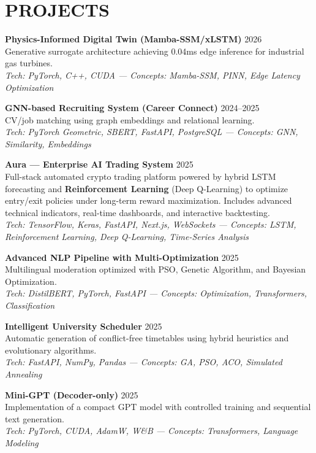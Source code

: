 \documentclass[a4paper,12pt]{article}
\begin{document}
\section{PROJECTS}
\setlength{\parskip}{10pt}
{\small

\textbf{Physics-Informed Digital Twin (Mamba-SSM/xLSTM)} \hfill 2026 \\
Generative surrogate architecture achieving 0.04ms edge inference for industrial gas turbines. \\
\textit{Tech: PyTorch, C++, CUDA — Concepts: Mamba-SSM, PINN, Edge Latency Optimization}

\textbf{GNN-based Recruiting System (Career Connect)} \hfill 2024--2025 \\
CV/job matching using graph embeddings and relational learning. \\
\textit{Tech: PyTorch Geometric, SBERT, FastAPI, PostgreSQL — Concepts: GNN, Similarity, Embeddings}

\textbf{Aura — Enterprise AI Trading System} \hfill 2025 \\
Full-stack automated crypto trading platform powered by hybrid LSTM forecasting and \textbf{Reinforcement Learning} (Deep Q-Learning) to optimize entry/exit policies under long-term reward maximization. Includes advanced technical indicators, real-time dashboards, and interactive backtesting. \\
\textit{Tech: TensorFlow, Keras, FastAPI, Next.js, WebSockets — Concepts: LSTM, Reinforcement Learning, Deep Q-Learning, Time-Series Analysis}

\textbf{Advanced NLP Pipeline with Multi-Optimization} \hfill 2025 \\
Multilingual moderation optimized with PSO, Genetic Algorithm, and Bayesian Optimization. \\
\textit{Tech: DistilBERT, PyTorch, FastAPI — Concepts: Optimization, Transformers, Classification}

\textbf{Intelligent University Scheduler} \hfill 2025 \\
Automatic generation of conflict-free timetables using hybrid heuristics and evolutionary algorithms. \\
\textit{Tech: FastAPI, NumPy, Pandas — Concepts: GA, PSO, ACO, Simulated Annealing}

\textbf{Mini-GPT (Decoder-only)} \hfill 2025 \\
Implementation of a compact GPT model with controlled training and sequential text generation. \\
\textit{Tech: PyTorch, CUDA, AdamW, W\&B — Concepts: Transformers, Language Modeling}

}
\end{document}
